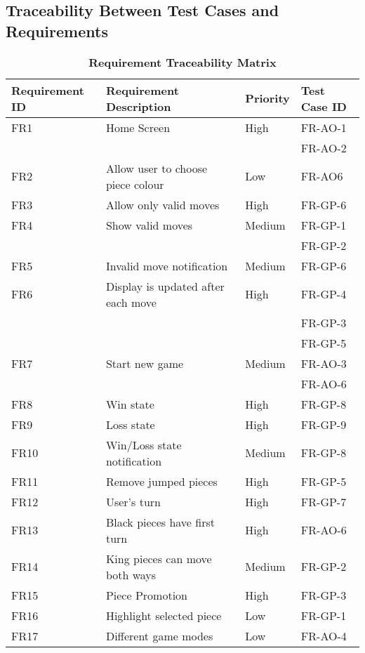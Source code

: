 \documentclass[12pt, titlepage]{article}
\begin{document}
\subsection{Traceability Between Test Cases and Requirements}
\newpage
\begin{table}[H]
    \begin{center}
	\caption{\bf Requirement Traceability Matrix}
	\begin{adjustwidth}{-1.5cm}{}
	\begin{tabularx}{1.2\textwidth}{|p{3.4cm}|p{7cm}|p{1.6cm}|X|}
		\hline 
		{\bf Requirement ID}  & {\bf Requirement Description} & {\bf Priority} & {\bf Test Case ID} \\
		\hline
		FR1 & Home Screen & High & FR-AO-1\\
		& & & FR-AO-2\\
		\hline
		FR2 & Allow user to choose piece colour & Low & FR-AO6\\
		\hline
		FR3 & Allow only valid moves & High & FR-GP-6\\
		\hline
		FR4 & Show valid moves & Medium & FR-GP-1\\
		& & & FR-GP-2\\
		\hline
		FR5 & Invalid move notification & Medium & FR-GP-6\\
		\hline
		FR6 & Display is updated after each move & High & FR-GP-4\\
		& & & FR-GP-3\\
		& & & FR-GP-5\\
		\hline
		FR7 & Start new game & Medium & FR-AO-3\\
		& & & FR-AO-6\\
		\hline
		FR8 & Win state & High & FR-GP-8 \\
		\hline
		FR9 & Loss state & High & FR-GP-9 \\
		\hline
		FR10 & Win/Loss state notification & Medium & FR-GP-8 \\
		\hline
		FR11 & Remove jumped pieces & High & FR-GP-5\\
		\hline
		FR12 & User's turn & High & FR-GP-7\\
		\hline
		FR13 & Black pieces have first turn & High &  FR-AO-6\\
		\hline
		FR14 & King pieces can move both ways & Medium & FR-GP-2\\
		\hline
		FR15 & Piece Promotion & High & FR-GP-3\\
		\hline
		FR16 & Highlight selected piece & Low & FR-GP-1\\
		\hline
		FR17 & Different game modes & Low & FR-AO-4\\

\end{tabularx}
\end{adjustwidth}
\end{center}
\end{table}
\end{document}
